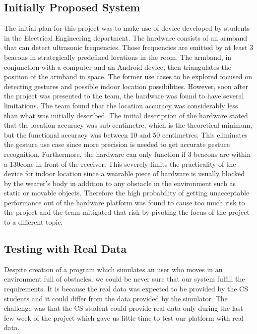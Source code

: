 \documentclass[prodmode,acmtosem]{acmsmall} %
\begin{document}
\subsection{Initially Proposed System}
\label{sec:Prelim}

The initial plan for this project was to make use of device developed by students in the Electrical Engineering department. The hardware consists of an armband that can detect ultrasonic frequencies. Those frequencies are emitted by at least 3 beacons in strategically predefined locations in the room. The armband, in conjunction with a computer and an Android device, then triangulates the position of the armband in space.
The former use cases to be explored focused on detecting gestures and possible indoor location possibilities. However, soon after the project was presented to the team, the hardware was found to have several limitations. The team found that the location accuracy was considerably less than what was initially described. The initial description of the hardware stated that the location accuracy was sub-centimetre, which is the theoretical minimum, but the functional accuracy was between 10 and 50 centimetres. This eliminates the gesture use case since more precision is needed to get accurate gesture recognition.
Furthermore, the hardware can only function if 3 beacons are within a 130\degree cone in front of the receiver. This severely limits the practicality of the device for indoor location since a wearable piece of hardware is usually blocked by the wearer's body in addition to any obstacle in the environment such as static or movable objects.
Therefore the high probability of getting unacceptable performance out of the hardware platform was found to cause too much risk to the project and the team mitigated that risk by pivoting the focus of the project to a different topic.

\subsection{Testing with Real Data}
Despite creation of a program which simulates an user who moves in an environment full of obstacles, we could be never sure that our system fulfill the requirements. It is because the real data was expected to be provided by the CS students and it could differ from the data provided by the simulator. The challenge was that the CS student could provide real data only during the last few week of the project which gave us little time to test our platform with real data. 
\end{document}
